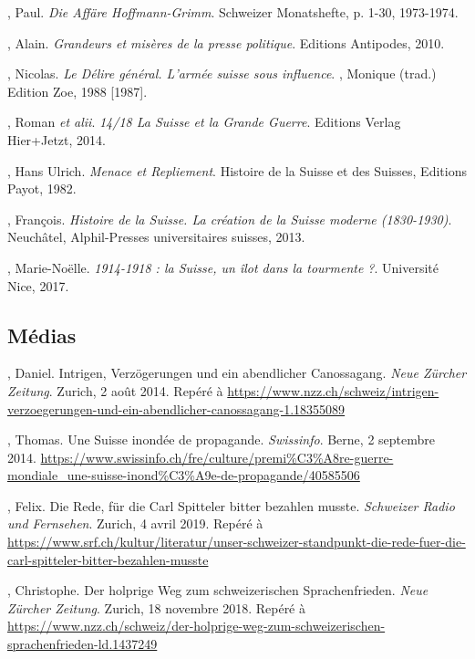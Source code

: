 \documentclass[french,a4paper]{article}
\begin{document}
\begin{thebibliography}{9}
, Paul.
\textit{Die Affäre Hoffmann-Grimm}.
Schweizer Monatshefte, p. 1-30, 1973-1974.

, Alain.
\textit{Grandeurs et misères de la presse politique}.
Editions Antipodes, 2010.

, Nicolas.
\textit{Le Délire général. L’armée suisse sous influence}.
, Monique (trad.)
Edition Zoe, 1988 [1987].

, Roman \textit{et alii}.
\textit{14/18 La Suisse et la Grande Guerre}.
Editions Verlag Hier+Jetzt, 2014.

, Hans Ulrich.
\textit{Menace et Repliement}.
Histoire de la Suisse et des Suisses, Editions Payot, 1982.

, François.
\textit{Histoire de la Suisse. La création de la Suisse moderne (1830-1930)}.
Neuchâtel, Alphil-Presses universitaires suisses, 2013.

, Marie-Noëlle.
\textit{1914-1918 : la Suisse, un îlot dans la tourmente ?}.
Université Nice, 2017.

\subsection*{Médias}

, Daniel.
Intrigen, Verzögerungen und ein abendlicher Canossagang. \textit{Neue Zürcher Zeitung}.
Zurich, 2 août 2014.
Repéré à \url{https://www.nzz.ch/schweiz/intrigen-verzoegerungen-und-ein-abendlicher-canossagang-1.18355089}

, Thomas.
Une Suisse inondée de propagande.
\textit{Swissinfo}. Berne, 2 septembre 2014.
\url{https://www.swissinfo.ch/fre/culture/premi\%C3\%A8re-guerre-mondiale_une-suisse-inond\%C3\%A9e-de-propagande/40585506}

, Felix.
Die Rede, für die Carl Spitteler bitter bezahlen musste. \textit{Schweizer Radio und Fernsehen}.
Zurich, 4 avril 2019.
Repéré à \url{https://www.srf.ch/kultur/literatur/unser-schweizer-standpunkt-die-rede-fuer-die-carl-spitteler-bitter-bezahlen-musste}

, Christophe.
Der holprige Weg zum schweizerischen Sprachenfrieden. \textit{Neue Zürcher Zeitung}.
Zurich, 18 novembre 2018.
Repéré à \url{https://www.nzz.ch/schweiz/der-holprige-weg-zum-schweizerischen-sprachenfrieden-ld.1437249}

\end{thebibliography}
\end{document}
